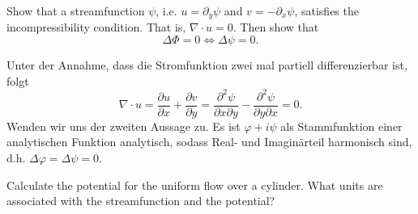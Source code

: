\documentclass[12pt]{exam}
\newcommand{\del}{\partial}
\begin{document}
\begin{questions}
    
    \question Show that a streamfunction $\psi$, i.e. $u = \del_y \psi$ and $v = -\del_x \psi$, satisfies the incompressibility condition. That is, $\nabla \cdot u = 0$. Then show that
    \begin{equation*}
        \Delta \Phi = 0 \iff \Delta \psi = 0.
    \end{equation*}
    
    \begin{solution}
        Unter der Annahme, dass die Stromfunktion zwei mal partiell differenzierbar ist, folgt
        \begin{equation*}
            \nabla \cdot u = \frac{\del u}{\del x} + \frac{\del v}{\del y} = \frac{\del^2 \psi}{\del x \del y} - \frac{\del^2 \psi}{\del y \del x} = 0.
        \end{equation*}
        Wenden wir uns der zweiten Aussage zu. Es ist $\varphi + i \psi$ als Stammfunktion einer analytischen Funktion analytisch, sodass Real- und Imaginärteil harmonisch sind, d.h. $\Delta \varphi = \Delta \psi = 0$.
    \end{solution}
    
    
    \question Calculate the potential for the uniform flow over a cylinder. What units are associated with the streamfunction and the potential?
    

\end{questions}
\end{document}
